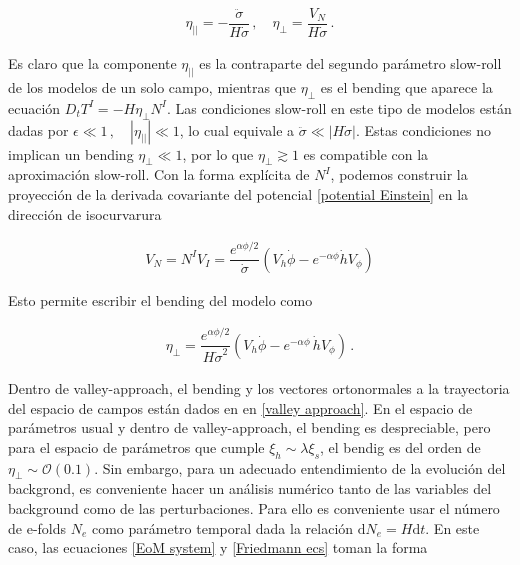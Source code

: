 \documentclass[12pt,a4paper,english,nofootinbib]{revtex4}
\newcommand{\dif}{\mathrm{d}}
\newcommand{\beq}{\begin{eqnarray}}
\newcommand{\enq}{\end{eqnarray}}
\begin{document}
\beq
    \eta_{||} = -\dfrac{\ddot{\sigma}}{H\dot{\sigma}}\,, \quad \eta_\perp = \dfrac{V_N}{H\dot{\sigma}}\,.
    \label{second SR}
\enq

Es claro que la componente $\eta_{||}$ es la contraparte del segundo parámetro slow-roll de los modelos de un solo campo, mientras que $\eta_\perp$ es el bending que aparece la ecuación $D_t T^I = - H\eta_\perp N^I$. 
Las condiciones slow-roll en este tipo de modelos  están dadas por $\epsilon\ll 1\,,\quad |\eta_{||}|\ll 1$, lo cual equivale a $\ddot{\sigma} \ll |H\dot{\sigma}|$. Estas condiciones no implican un bending $\eta_\perp \ll 1$, por lo que $\eta_\perp \gtrsim 1$ es compatible con la aproximación slow-roll. Con la forma explícita de $N^I$, podemos construir la proyección de la derivada covariante del potencial \eqref{potential Einstein} en la dirección de isocurvarura

\begin{align}
    V_N = N^I V_I  = \dfrac{e^{\alpha\phi/2}}{\dot{\sigma}}(V_h \dot{\phi} - e^{-\alpha\phi}\dot{h} V_\phi)
    \label{V_N}
\end{align}

Esto permite escribir el bending del modelo como 

\beq 
\eta_\perp = \dfrac{e^{\alpha\phi/2}}{H\dot{\sigma}^2}\left( V_h \dot{\phi} - e^{-\alpha\phi}\,\dot{h}V_\phi \right)\,.
\label{bending}
\enq 

Dentro de valley-approach, el bending y los vectores ortonormales a la trayectoria del espacio de campos están dados en en \eqref{valley approach}. En el espacio de parámetros usual y dentro de valley-approach, el bending es despreciable, pero para el espacio de parámetros que cumple $\xi_h \sim \lambda\xi_s$, el bendig es del orden de $\eta_\perp \sim \mathcal{O}(0.1)$. Sin embargo, para un adecuado entendimiento de la evolución del backgrond, es conveniente hacer un análisis numérico tanto de las variables del background como de las perturbaciones. Para ello es conveniente usar el número de e-folds $N_e$ como parámetro temporal dada la relación $\dif N_e = H \dif t$. En este caso, las ecuaciones \eqref{EoM system} y \eqref{Friedmann ecs} toman la forma 
\end{document}
